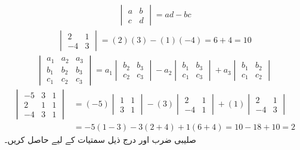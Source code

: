 \begin{align*}
\begin{vmatrix}a&b\\c&d  \end{vmatrix}=ad-bc
\end{align*}
\begin{align*}
\begin{vmatrix} 2&1\\-4&3 \end{vmatrix}=(2)(3)-(1)(-4)=6+4=10
\end{align*}
\begin{align*}
\begin{vmatrix} a_1&a_2&a_3\\ b_1&b_2&b_3\\c_1&c_2&c_3 \end{vmatrix}=
a_1\begin{vmatrix} b_2&b_3\\ c_2&c_3\end{vmatrix}-a_2\begin{vmatrix} b_1&b_3\\c_1&c_3 \end{vmatrix}+a_3\begin{vmatrix} b_1&b_2\\c_1&c_2 \end{vmatrix}
\end{align*}
\begin{align*}
\begin{vmatrix} -5&3&1\\2&1&1\\-4&3&1\end{vmatrix}&=
(-5)\begin{vmatrix} 1&1\\3&1\end{vmatrix}-(3)\begin{vmatrix}2 &1\\ -4&1\end{vmatrix}+(1)\begin{vmatrix} 2&1\\-4&3 \end{vmatrix}\\
&=-5(1-3)-3(2+4)+1(6+4)=10-18+10=2
\end{align*}
صلیبی ضرب  اور  درج ذیل سمتیات کے لیے حاصل کریں۔
